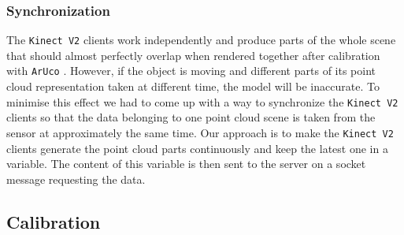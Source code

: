 \documentclass{article}
\begin{document}
\subsubsection{Synchronization}
The \texttt{Kinect V2} clients work independently and produce parts of the whole scene that should almost perfectly overlap when rendered together after calibration with \texttt{ArUco} \cite{aruco}. However, if the object is moving and different parts of its point cloud representation taken at different time, the model will be inaccurate. To minimise this effect we had to come up with a way to synchronize the \texttt{Kinect V2} clients so that the data belonging to one point cloud scene is taken from the sensor at approximately the same time. Our approach is to make the \texttt{Kinect V2} clients generate the point cloud parts continuously and keep the latest one in a variable. The content of this variable is then sent to the server on a socket message requesting the data.
\subsection{Calibration}
\end{document}
